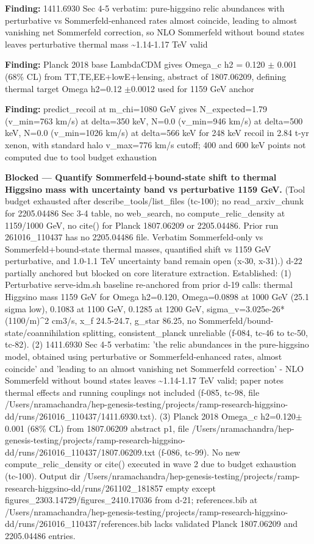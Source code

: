 \documentclass[11pt,a4paper]{article}
\begin{document}
\textbf{Finding:} 1411.6930 Sec 4-5 verbatim: pure-higgsino relic abundances with perturbative vs Sommerfeld-enhanced rates almost coincide, leading to almost vanishing net Sommerfeld correction, so NLO Sommerfeld without bound states leaves perturbative thermal mass \textasciitilde{}1.14-1.17 TeV valid

\textbf{Finding:} Planck 2018 base LambdaCDM gives Omega\_c h2 = 0.120 $\pm$ 0.001 (68\% CL) from TT,TE,EE+lowE+lensing, abstract of 1807.06209, defining thermal target Omega h2=0.12 $\pm$0.0012 used for 1159 GeV anchor

\textbf{Finding:} predict\_recoil at m\_chi=1080 GeV gives N\_expected=1.79 (v\_min=763 km/s) at delta=350 keV, N=0.0 (v\_min=946 km/s) at delta=500 keV, N=0.0 (v\_min=1026 km/s) at delta=566 keV for 248 keV recoil in 2.84 t-yr xenon, with standard halo v\_max=776 km/s cutoff; 400 and 600 keV points not computed due to tool budget exhaustion

\textbf{Blocked --- Quantify Sommerfeld+bound-state shift to thermal Higgsino mass with uncertainty band vs perturbative 1159 GeV.} (Tool budget exhausted after describe\_tools/list\_files (tc-100); no read\_arxiv\_chunk for 2205.04486 Sec 3-4 table, no web\_search, no compute\_relic\_density at 1159/1000 GeV, no cite() for Planck 1807.06209 or 2205.04486. Prior run 261016\_110437 has no 2205.04486 file. Verbatim Sommerfeld-only vs Sommerfeld+bound-state thermal masses, quantified shift vs 1159 GeV perturbative, and 1.0-1.1 TeV uncertainty band remain open (x-30, x-31).) d-22 partially anchored but blocked on core literature extraction. Established: (1) Perturbative serve-idm.sh baseline re-anchored from prior d-19 calls: thermal Higgsino mass 1159 GeV for Omega h2=0.120, Omega=0.0898 at 1000 GeV (25.1 sigma low), 0.1083 at 1100 GeV, 0.1285 at 1200 GeV, sigma\_v=3.025e-26*(1100/m)\textasciicircum{}2 cm3/s, x\_f 24.5-24.7, g\_star 86.25, no Sommerfeld/bound-state/coannihilation splitting, consistent\_planck unreliable (f-084, tc-46 to tc-50, tc-82). (2) 1411.6930 Sec 4-5 verbatim: 'the relic abundances in the pure-higgsino model, obtained using perturbative or Sommerfeld-enhanced rates, almost coincide' and 'leading to an almost vanishing net Sommerfeld correction' - NLO Sommerfeld without bound states leaves \textasciitilde{}1.14-1.17 TeV valid; paper notes thermal effects and running couplings not included (f-085, tc-98, file /Users/nramachandra/hep-genesis-testing/projects/ramp-research-higgsino-dd/runs/261016\_110437/1411.6930.txt). (3) Planck 2018 Omega\_c h2=0.120$\pm$0.001 (68\% CL) from 1807.06209 abstract p1, file /Users/nramachandra/hep-genesis-testing/projects/ramp-research-higgsino-dd/runs/261016\_110437/1807.06209.txt (f-086, tc-99). No new compute\_relic\_density or cite() executed in wave 2 due to budget exhaustion (tc-100). Output dir /Users/nramachandra/hep-genesis-testing/projects/ramp-research-higgsino-dd/runs/261102\_181857 empty except figures\_2303.14729/figures\_2410.17036 from d-21; references.bib at /Users/nramachandra/hep-genesis-testing/projects/ramp-research-higgsino-dd/runs/261016\_110437/references.bib lacks validated Planck 1807.06209 and 2205.04486 entries.
\end{document}
